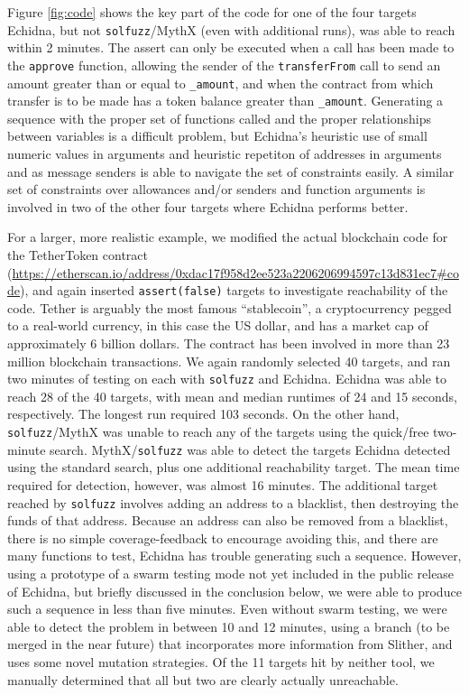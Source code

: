   Figure \ref{fig:code} shows the key part of the code for one of the four targets Echidna, but not {\tt solfuzz}/MythX (even with additional runs), was able to reach within 2 minutes.  The assert can only be executed when a call has been made to the {\tt approve} function, allowing the sender of the {\tt transferFrom} call to send an amount greater than or equal to {\tt \_amount}, and when  the contract from which transfer is to be made has a token balance greater than {\tt \_amount}.  Generating a sequence with the proper set of functions called and the proper relationships between variables is a difficult problem, but Echidna's heuristic use of small numeric values in arguments and heuristic repetiton of addresses in arguments and as message senders is able to navigate the set of constraints easily.  A similar set of constraints over allowances and/or senders and function arguments is involved in two of the other four targets where Echidna performs better.

For a larger, more realistic example, we modified the actual blockchain code for the TetherToken contract (\url{https://etherscan.io/address/0xdac17f958d2ee523a2206206994597c13d831ec7#code}), and again inserted {\tt assert(false)} targets to investigate reachability of the code.  Tether is arguably the most famous ``stablecoin'', a cryptocurrency pegged to a real-world currency, in this case the US dollar, and has a market cap of approximately 6 billion dollars.  The contract has been involved in more than 23 million blockchain transactions.
We again randomly selected 40 targets, and ran two minutes of testing on each with {\tt solfuzz} and Echidna.  Echidna was able to reach 28 of the 40 targets, with mean and median runtimes of 24 and 15 seconds, respectively.  The longest run required 103 seconds.  On the other hand, {\tt solfuzz}/MythX was unable to reach any of the targets using the quick/free two-minute search.   MythX/{\tt solfuzz} was able to detect the targets Echidna detected using the standard search, plus one additional reachability target.  The mean time required for detection, however, was almost 16 minutes.  The additional target reached by {\tt solfuzz} involves adding an address to a blacklist, then destroying the funds of that address.  Because an address can also be removed from a blacklist, there is no simple coverage-feedback to encourage avoiding this, and there are many functions to test, Echidna has trouble generating such a sequence.  However, using a prototype of a swarm testing \cite{ISSTA12} mode not yet included in the public release of Echidna, but briefly discussed in the conclusion below, we were able to produce such a sequence in less than five minutes.  Even without swarm testing, we were able to detect the problem in between 10 and 12 minutes, using a branch (to be merged in the near future) that incorporates more information from Slither, and uses some novel mutation strategies.  Of the 11 targets hit by neither tool, we manually determined that all but two are clearly actually unreachable.